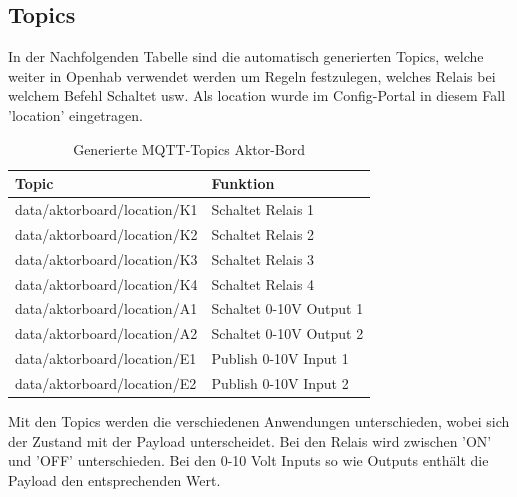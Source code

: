 \subsection{Topics}
In der Nachfolgenden Tabelle sind die automatisch generierten Topics, welche weiter in Openhab verwendet werden um Regeln festzulegen, welches Relais bei welchem Befehl Schaltet usw. Als location wurde im Config-Portal in diesem Fall 'location' eingetragen.
\begin{table}[H]
	\centering
	\begin{tabular}{|l|l|}
		\hline 
		 Topic  & Funktion  \\ 
		\hline 
		data/aktorboard/location/K1 & Schaltet Relais 1  \\ 
		\hline
		data/aktorboard/location/K2 & Schaltet Relais 2  \\ 
		\hline
		data/aktorboard/location/K3 & Schaltet Relais 3  \\ 
		\hline
		data/aktorboard/location/K4 & Schaltet Relais 4  \\ 
		\hline 
		data/aktorboard/location/A1 & Schaltet 0-10V Output 1  \\ 
		\hline
		data/aktorboard/location/A2 & Schaltet 0-10V Output 2  \\ 
		\hline
		data/aktorboard/location/E1 & Publish 0-10V Input 1  \\ 
		\hline
		data/aktorboard/location/E2 & Publish 0-10V Input 2  \\ 
		\hline
	\end{tabular} 	
\caption{Generierte MQTT-Topics Aktor-Bord}
\label{tab: MQTT-Topics Aktor}
\end{table}
 
 Mit den Topics werden die verschiedenen Anwendungen unterschieden, wobei sich der Zustand mit der Payload unterscheidet. Bei den Relais wird zwischen 'ON' und 'OFF' unterschieden. Bei den 0-10 Volt Inputs so wie Outputs enthält die Payload den entsprechenden Wert. 
